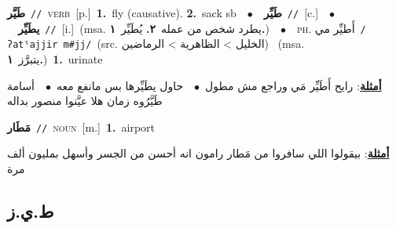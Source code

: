 \documentclass[10pt,a4paper,twoside]{article} %
\begin{document}
\begin{multicols}{2}
{\setlength\topsep{0pt}\textbf{\foreignlanguage{arabic}{طَيَّر}}\ {\color{gray}\texttt{//}\color{black}}\ \textsc{verb}\ [p.]\ \textbf{1.}~fly (causative).  \textbf{2.}~sack sb\ \ $\bullet$\ \ \setlength\topsep{0pt}\textbf{\foreignlanguage{arabic}{طَيِّر}}\ {\color{gray}\texttt{//}\color{black}}\ [c.]\ \ $\bullet$\ \ \setlength\topsep{0pt}\textbf{\foreignlanguage{arabic}{يطَيِّر}}\ {\color{gray}\texttt{//}\color{black}}\ [i.]\ \color{gray}(msa. \foreignlanguage{arabic}{يطرد شخص من عمله}~\foreignlanguage{arabic}{\textbf{٢.}}  \foreignlanguage{arabic}{يُطَيِّر}~\foreignlanguage{arabic}{\textbf{١.}})\color{black}\ \ $\bullet$\ \ \textsc{ph.} \color{gray} \foreignlanguage{arabic}{أَطيِّر مي}\color{black}\ {\color{gray}\texttt{/{\sffamily ʔatˤajjir m\#jj}/}\color{black}}\ \color{gray}(src. \foreignlanguage{arabic}{الخليل > الظاهرية > الرماضين})\color{black}\ \color{gray} (msa. \foreignlanguage{arabic}{يتبرَّز}~\foreignlanguage{arabic}{\textbf{١.}})\color{black}\ \textbf{1.}~urinate\  \begin{flushright}\color{gray}\foreignlanguage{arabic}{\textbf{\underline{\foreignlanguage{arabic}{أمثلة}}}: رايح أَطَيِّر مَي وراجع مش مطول\ $\bullet$\ \  حاول يطَيِّرها بس مانفع معه\ $\bullet$\ \  أسامة طَيَّرُوه زمان هلا عيَّنوا منصور بداله}\end{flushright}\color{black}} \vspace{2mm}

{\setlength\topsep{0pt}\textbf{\foreignlanguage{arabic}{مَطَار}}\ {\color{gray}\texttt{//}\color{black}}\ \textsc{noun}\ [m.]\ \textbf{1.}~airport\  \begin{flushright}\color{gray}\foreignlanguage{arabic}{\textbf{\underline{\foreignlanguage{arabic}{أمثلة}}}: بيقولوا اللي سافروا من مَطار رامون انه أحسن من الجسر وأسهل بمليون ألف مرة}\end{flushright}\color{black}} \vspace{2mm}

\vspace{-3mm}
\subsection*{\color{blue}\foreignlanguage{arabic}{ط.ي.ز}\color{blue}{}} 


\end{multicols}
\end{document}
